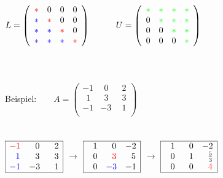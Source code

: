 	$L=	\left(\begin{array}{cccc}
			\color{red}* & 0 & 0 & 0\\
		 	\color{blue}* & \color{red}* & 0 & 0\\
			\color{blue}* & \color{blue}* & \color{red}* & 0\\
			\color{blue}* & \color{blue}* & \color{blue}* & \color{red}*\\
	\end{array}\right)$\ \ \ \ \ \ 
	$U=	\left(\begin{array}{cccc}
			\color{green}* & \color{green}* & \color{green}* & \color{green}*\\
		 	0 & \color{green}* & \color{green}* & \color{green}*\\
			0 & 0 & \color{green}* & \color{green}*\\
			0 & 0 & 0 & \color{green}*\\
	\end{array}\right)$\\\\\\\\
	Beispiel:\ \ \ \  
	$A=	\left(\begin{array}{ccc}
		-1 &\ \ 0 &\ \ 2\\
		 \ \ 1 &\ \ 3 &\ \ 3\\
		-1 &-3 &\ \ 1\\
	\end{array}\right)$\\\\\\ 
	$\begin{array}{|ccc|}
			\hline 
			\color{red}-1 & \ \ 0 & \ \ 2\\
			\color{blue}\ \ 1 & \ \ 3 & \ \ 3\\
			\color{blue}-1 & -3 & \ \ 1\\
			\hline
	\end{array}$
	$\rightarrow$
	$\begin{array}{|ccc|}
			\hline 
			\ \ 1 & \ \ 0 & -2\\
			\ \ 0 & \color{red}\ \ 3 & \ \ 5\\
			\ \ 0 & \color{blue}-3 & -1\\
			\hline
	\end{array}$
	$\rightarrow$
	$\begin{array}{|ccc|}
			\hline 
			\ \ 1 & \ \ 0 & -2\\
			\ \ 0 & \ \ 1 & \ \ \frac 5 3\\
			\ \ 0 & \ \ 0 & \color{red}\ \ 4\\
			\hline
	\end{array}$
